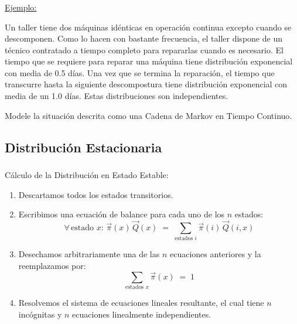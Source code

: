 \documentclass[ 10pt, xcolor = dvipsnames]{beamer}
\begin{document}
\begin{frame}[allowframebreaks]
\frametitle{\insertsubsection}

\underline{Ejemplo:}

Un taller tiene dos m\'aquinas id\'enticas en operaci\'on continua excepto cuando se descomponen. Como lo hacen con bastante frecuencia, el taller dispone de un t\'ecnico contratado a tiempo completo para repararlas cuando es necesario. \linebreak El tiempo que se requiere para reparar una m\'aquina tiene distribuci\'on exponencial con media de 0.5 d\'ias. Una vez que se termina la reparaci\'on, el tiempo que transcurre hasta la siguiente descompostura tiene distribuci\'on exponencial con media de un 1.0 d\'ias. Estas distribuciones son independientes. 

Modele la situaci\'on descrita como una Cadena de Markov en Tiempo Continuo. 

\end{frame}

\subsection{Distribuci\'on Estacionaria}

\begin{frame}[allowframebreaks]
\frametitle{\insertsubsection}

C\'alculo de la Distribuci\'on en Estado Estable: 
\begin{enumerate}
\item Descartamos todos los estados transitorios. 
\item Escribimos una ecuaci\'on de balance para cada uno de los $n$ estados: 
\[
\forall \, \text{estado } x \colon \, \vec{\pi}(x) \, \vec{Q}(x) \; = \; 
\sum_{\text{estados }i} \vec{\pi}(i) \, \vec{Q}(i,x) 
\]
\item Desechamos arbitrariamente una de las $n$ ecuaciones anteriores y la reemplazamos por: 
\[
\sum_{\text{estados }x} \vec{\pi}(x) \; = \; 1
\]
\item Resolvemos el sistema de ecuaciones lineales resultante, el cual tiene \linebreak $n$ inc\'ognitas y $n$ ecuaciones linealmente independientes. 

\end{enumerate}

\end{frame}
\end{document}
